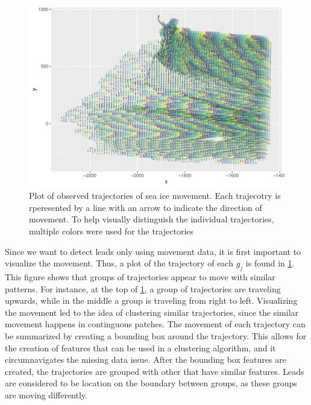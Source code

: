 \documentclass[12pt]{article}
\begin{document}
\begin{figure}[tbp]

{\centering \includegraphics[width=\linewidth,]{spatio-temporal-model-arctic-sea-ice_files/figure-latex/trajectories-1} 

}

\caption{Plot of observed trajectories of sea ice movement. Each trajecotry is rperesented by a line with an arrow to indicate the direction of movement. To help visually distinguish the individual trajectories, multiple colors were used for the trajectories}\label{fig:trajectories}
\end{figure}

Since we want to detect leads only using movement data, it is first
important to visualize the movement. Thus, a plot of the trajectory of
each \(g_j\) is found in \cref{fig:trajectories}. This figure shows that
groups of trajectories appear to move with similar patterns. For
instance, at the top of \cref{fig:trajectories}, a group of trajectories
are traveling upwards, while in the middle a group is traveling from
right to left. Visualizing the movement led to the idea of clustering
similar trajectories, since the similar movement happens in continguous
patches. The movement of each trajectory can be summarized by creating a
bounding box around the trajectory. This allows for the creation of
features that can be used in a clustering algorithm, and it
circumnavigates the missing data issue. After the bounding box features
are created, the trajectories are grouped with other that have similar
features. Leads are considered to be location on the boundary between
groups, as these groups are moving differently.
\end{document}
